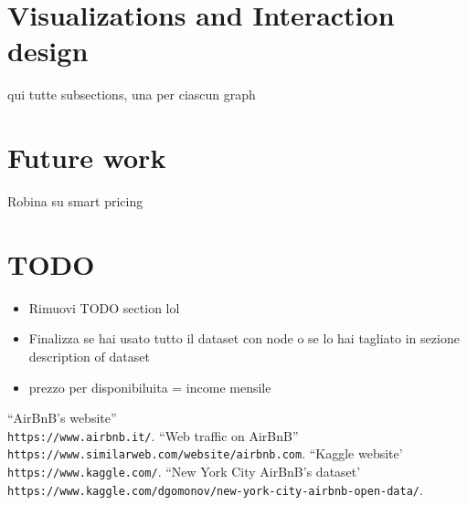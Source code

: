 \documentclass[11pt]{article}
\begin{document}
\section{Visualizations and Interaction design}
qui tutte subsections, una per ciascun graph
\section{Future work}
Robina su smart pricing

\section{TODO}
\begin{itemize}
\item Rimuovi TODO section lol
\item Finalizza se hai usato tutto il dataset con node o se lo hai tagliato in sezione description of dataset
\item prezzo per disponibiluita = income mensile
\end{itemize}


\newpage
\begin{thebibliography}{10}
``AirBnB's website'' \\
  \verb|https://www.airbnb.it/|.
``Web traffic on AirBnB'' \\
  \verb|https://www.similarweb.com/website/airbnb.com|.
``Kaggle website' \\
  \verb|https://www.kaggle.com/|.
``New York City AirBnB's dataset' \\
  \verb|https://www.kaggle.com/dgomonov/new-york-city-airbnb-open-data/|.
\end{thebibliography}
\end{document}
